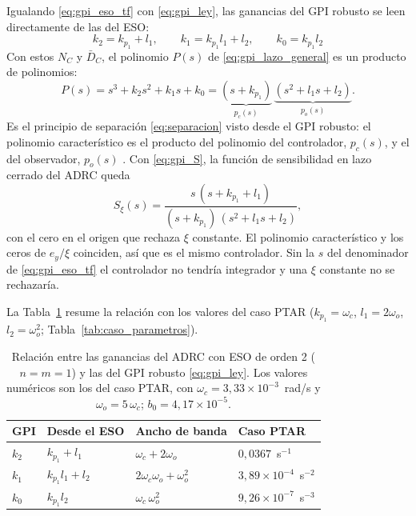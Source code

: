 Igualando \eqref{eq:gpi_eso_tf} con \eqref{eq:gpi_ley}, las ganancias del GPI robusto
se leen directamente de las del ESO:
\begin{equation}
\boxed{\;k_2 = k_{p_1} + l_1, \qquad k_1 = k_{p_1} l_1 + l_2, \qquad k_0 = k_{p_1} l_2\;}
\label{eq:eso2gpi}
\end{equation}
Con estos $N_C$ y $\bar{D}_C$, el polinomio $P(s)$ de \eqref{eq:gpi_lazo_general} es
un producto de polinomios:
\begin{equation}
P(s) = s^3 + k_2 s^2 + k_1 s + k_0
= \underbrace{(s + k_{p_1})}_{p_c(s)}\,\underbrace{(s^2 + l_1 s + l_2)}_{p_o(s)} .
\label{eq:gpi_producto}
\end{equation}
Es el principio de separación \eqref{eq:separacion} visto desde el GPI robusto: el
polinomio característico es el producto del polinomio del
controlador, $p_c(s)$, y el del observador, $p_o(s)$
\cite{sira2017adrc}. Con \eqref{eq:gpi_S}, la función de
sensibilidad en lazo cerrado del ADRC queda
\begin{equation}
S_{\xi}(s) = \frac{s\,(s + k_{p_1} + l_1)}{(s + k_{p_1})\,(s^2 + l_1 s + l_2)} ,
\label{eq:gpi_producto_S}
\end{equation}
con el cero en el origen que rechaza $\xi$ constante. El polinomio
característico y los ceros de $e_y/\xi$ coinciden, así que es el mismo
controlador. Sin la $s$ del denominador de
\eqref{eq:gpi_eso_tf} el controlador no tendría integrador y una $\xi$ constante
no se rechazaría.

La Tabla~\ref{tab:gpi_eso} resume la relación con los valores del caso PTAR
($k_{p_1} = \omega_c$, $l_1 = 2\omega_o$, $l_2 = \omega_o^2$;
Tabla~\ref{tab:caso_parametros}).

\begin{table}[H]
\centering
\caption[Relación entre las ganancias del ESO y del GPI]{Relación entre las
ganancias del ADRC con ESO de orden 2 ($n = m = 1$) y las del GPI robusto
\eqref{eq:gpi_ley}. Los valores numéricos son los del caso PTAR, con
$\omega_c = 3{,}33\times10^{-3}$~rad/s y $\omega_o = 5\,\omega_c$; 
$b_0 = 4{,}17\times10^{-5}$.}
\label{tab:gpi_eso}
\begin{tabular}{@{}llll@{}}
\toprule
GPI & Desde el ESO & Ancho de banda & Caso PTAR \\
\midrule
$k_2$ & $k_{p_1} + l_1$ & $\omega_c + 2\omega_o$
      & $0{,}0367$~s$^{-1}$ \\
$k_1$ & $k_{p_1} l_1 + l_2$ & $2\omega_c\omega_o + \omega_o^2$
      & $3{,}89\times10^{-4}$~s$^{-2}$ \\
$k_0$ & $k_{p_1} l_2$ & $\omega_c\,\omega_o^2$
      & $9{,}26\times10^{-7}$~s$^{-3}$ \\
\bottomrule
\end{tabular}
\end{table}

